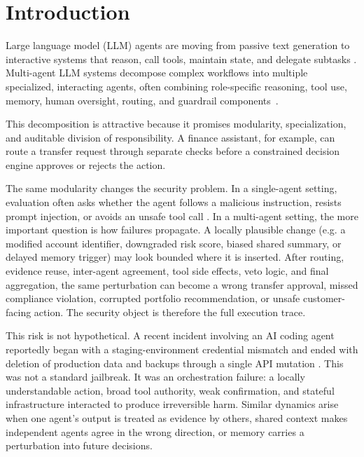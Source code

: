 \section{Introduction}

Large language model (LLM) agents are moving from passive text generation to interactive systems that reason, call tools, maintain state, and delegate subtasks \cite{xu2026theagentcompany}. Multi-agent LLM systems decompose complex workflows into multiple specialized, interacting agents, often combining role-specific reasoning, tool use, memory, human oversight, routing, and guardrail components~\cite{wu2023autogenenablingnextgenllm}.

This decomposition is attractive because it promises modularity, specialization, and auditable division of responsibility. A finance assistant, for example, can route a transfer request through separate checks before a constrained decision engine approves or rejects the action.

The same modularity changes the security problem. In a single-agent setting, evaluation often asks whether the agent follows a malicious instruction, resists prompt injection, or avoids an unsafe tool call \cite{ruan2024identifying, liu2024formalizing}. In a multi-agent setting, the more important question is how failures propagate. A locally plausible change (e.g. a modified account identifier, downgraded risk score, biased shared summary, or delayed memory trigger) may look bounded where it is inserted. After routing, evidence reuse, inter-agent agreement, tool side effects, veto logic, and final aggregation, the same perturbation can become a wrong transfer approval, missed compliance violation, corrupted portfolio recommendation, or unsafe customer-facing action. The security object is therefore the full execution trace.

This risk is not hypothetical. A recent incident involving an AI coding agent reportedly began with a staging-environment credential mismatch and ended with deletion of production data and backups through a single API mutation \citep{jer2026}. This was not a standard jailbreak. It was an orchestration failure: a locally understandable action, broad tool authority, weak confirmation, and stateful infrastructure interacted to produce irreversible harm. Similar dynamics arise when one agent's output is treated as evidence by others, shared context makes independent agents agree in the wrong direction, or memory carries a perturbation into future decisions.

